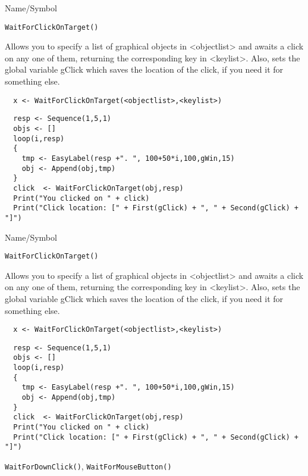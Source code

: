 \begin{desc}{Name/Symbol}
\item[Name/Symbol]  	\verb+WaitForClickOnTarget()+

\item[Description]	
  Allows you to specify a list of graphical objects in <objectlist> and awaits a click
  on any one of them, returning the corresponding key in <keylist>.  Also, sets the 
  global variable gClick which saves the location of the click, if 
  you need it for something else.
\item[Usage]		
\begin{verbatim}
  x <- WaitForClickOnTarget(<objectlist>,<keylist>)
\end{verbatim}

\item[Example]	

\begin{verbatim}
  resp <- Sequence(1,5,1)
  objs <- []
  loop(i,resp)
  {
    tmp <- EasyLabel(resp +". ", 100+50*i,100,gWin,15)
    obj <- Append(obj,tmp)
  }
  click  <- WaitForClickOnTarget(obj,resp)
  Print("You clicked on " + click)
  Print("Click location: [" + First(gClick) + ", " + Second(gClick) + "]")
\end{verbatim}
\item[See Also]	
\end{desc}

\rl


\begin{desc}{Name/Symbol}
\item[Name/Symbol]  	\verb+WaitForClickOnTarget()+

\item[Description]	
  Allows you to specify a list of graphical objects in <objectlist> and awaits a click
  on any one of them, returning the corresponding key in <keylist>.  Also, sets the 
  global variable gClick which saves the location of the click, if 
  you need it for something else.
\item[Usage]		
\begin{verbatim}
  x <- WaitForClickOnTarget(<objectlist>,<keylist>)
\end{verbatim}

\item[Example]	

\begin{verbatim}
  resp <- Sequence(1,5,1)
  objs <- []
  loop(i,resp)
  {
    tmp <- EasyLabel(resp +". ", 100+50*i,100,gWin,15)
    obj <- Append(obj,tmp)
  }
  click  <- WaitForClickOnTarget(obj,resp)
  Print("You clicked on " + click)
  Print("Click location: [" + First(gClick) + ", " + Second(gClick) + "]")
\end{verbatim}
\item[See Also]	
  \verb+WaitForDownClick()+, \verb+WaitForMouseButton()+
\end{desc}

